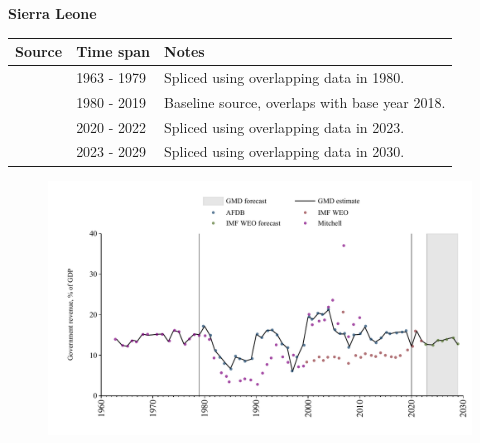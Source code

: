 \documentclass[12pt,a4paper,landscape]{article}
\begin{document}
\begin{adjustbox}{max totalsize={\paperwidth}{\paperheight},center}
\begin{minipage}[t][\textheight][t]{\textwidth}
\vspace*{0.5cm}
{}
\begin{center}
{\Large\bfseries Sierra Leone}
\end{center}
\vspace{0.5cm}
\begin{table}[H]
\centering
\small
\begin{tabular}{|l|l|l|}
\hline
\textbf{Source} & \textbf{Time span} & \textbf{Notes} \\
\hline
\rowcolor{white}\cite{Mitchell}& 1963 - 1979 &Spliced using overlapping data in 1980.\\
\rowcolor{lightgray}\cite{AFDB}& 1980 - 2019 &Baseline source, overlaps with base year 2018.\\
\rowcolor{white}\cite{IMF_WEO}& 2020 - 2022 &Spliced using overlapping data in 2023.\\
\rowcolor{lightgray}\cite{IMF_WEO_forecast}& 2023 - 2029 &Spliced using overlapping data in 2030.\\
\hline
\end{tabular}
\end{table}
\begin{figure}[H]
\centering
\includegraphics[width=\textwidth,height=0.6\textheight,keepaspectratio]{graphs/SLE_govrev_GDP.pdf}
\end{figure}
\end{minipage}
\end{adjustbox}
\end{document}
